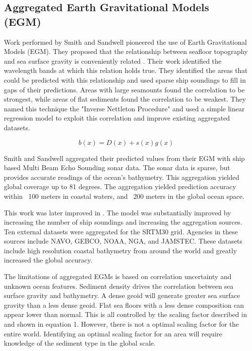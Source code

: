 \subsection{Aggregated Earth Gravitational Models (EGM)}
Work performed by Smith and Sandwell \cite{smith1994bathymetric}\cite{smith1997global} pioneered the use of Earth Gravitational Models (EGM).
They proposed that the relationship between seafloor topography and sea surface gravity is conveniently related \cite{smith1994bathymetric}.
Their work identified the wavelength bands at which this relation holds true.
They identified the areas that could be predicted with this relationship and used sparse ship soundings to fill in gaps of their predictions.
Areas with large seamounts found the correlation to be strongest, while areas of flat sediments found the correlation to be weakest.
They named this technique the "Inverse Nettleton Procedure" and used a simple linear regression model to exploit this correlation and improve existing aggregated datasets.

\begin{equation}
    b(x) = D(x) + s(x)g(x)
\end{equation}

\par
Smith and Sandwell aggregated their predicted values from their \ac{EGM} with ship based Multi Beam Echo Sounding sonar data.
The sonar data is sparse, but provides accurate readings of the ocean's bathymetry.
This aggregation yielded global coverage up to 81 degrees.
The aggregation yielded prediction accuracy within ~100 meters in coastal waters, and ~200 meters in the global ocean space.

\par 
This work was later improved in \cite{becker2009global}.
The model was substantially improved by increasing the number of ship soundings and increasing the aggregation sources.
Ten external datasets were aggregated for the SRTM30 grid.
Agencies in these sources include \ac{NAVO}, \ac{GEBCO}, \ac{NOAA}, \ac{NGA}, and \ac{JAMSTEC}.
These datasets include high resolution coastal bathymetry from around the world and greatly increased the global accuracy.

\par
The limitations of aggregated \ac{EGM}s is based on correlation uncertainty and unknown ocean features.
Sediment density drives the correlation between sea surface gravity and bathymetry.
A dense geoid will generate greater sea surface gravity than a less dense geoid.
Flat sea floors with a less dense composition can appear lower than normal.
This is all controlled by the scaling factor described in \cite{smith1994bathymetric} and shown in equation 1. 
However, there is not a optimal scaling factor for the entire world.
Identifying an optimal scaling factor for an area will require knowledge of the sediment type in the global scale.


